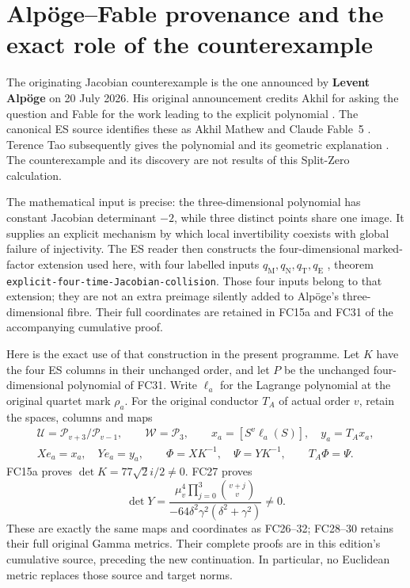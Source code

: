 \section{Alp\"oge--Fable provenance and the exact role of the counterexample}
\label{sec:alpoge-fable-role}

The originating Jacobian counterexample is the one announced by
\textbf{Levent Alp\"oge} on 20 July 2026. His original announcement
credits Akhil for asking the question and Fable for the work leading
to the explicit polynomial \cite{AlpogeAnnouncement}. The canonical
ES source identifies these as Akhil Mathew and Claude Fable~5
\cite{ES488}. Terence Tao subsequently gives the polynomial and
its geometric explanation \cite{Tao}. The counterexample and its
discovery are not results of this Split-Zero calculation.

The mathematical input is precise: the three-dimensional polynomial
has constant Jacobian determinant $-2$, while three distinct points
share one image. It supplies an explicit mechanism by which local
invertibility coexists with global failure of injectivity. The ES
reader then constructs the four-dimensional marked-factor extension
used here, with four labelled inputs $q_{\mathrm M},q_{\mathrm N},
q_{\mathrm T},q_{\mathrm E}$ \cite{ES488}, theorem
\texttt{explicit-four-time-Jacobian-collision}. Those four inputs
belong to that extension; they are not an extra preimage silently
added to Alp\"oge's three-dimensional fibre. Their full coordinates
are retained in FC15a and FC31 of the accompanying cumulative proof.

Here is the exact use of that construction in the present programme.
Let $K$ have the four ES columns in their unchanged order, and let
$P$ be the unchanged four-dimensional polynomial of FC31. Write
$\ell_a$ for the Lagrange polynomial at the original quartet mark
$\rho_a$. For the original conductor $T_A$ of actual order $v$,
retain the spaces, columns and maps
\[
\begin{gathered}
 \mathcal U=\mathcal P_{v+3}/\mathcal P_{v-1},\qquad
 \mathcal W=\mathcal P_3,\qquad
 x_a=[S^v\ell_a(S)],\quad y_a=T_Ax_a,\\
 Xe_a=x_a,\quad Ye_a=y_a,\qquad
 \Phi=XK^{-1},\quad\Psi=YK^{-1},\qquad T_A\Phi=\Psi.
 \tag{ALF1}
\end{gathered}
\]
FC15a proves $\det K=77\sqrt2 i/2\ne0$. FC27 proves
\[
 \det Y=
 \frac{\mu_v^4\prod_{j=0}^3\binom{v+j}{v}}
 {-64\delta^2\gamma^2(\delta^2+\gamma^2)}\ne0.
 \tag{ALF2}
\]
These are exactly the same maps and coordinates as FC26--32;
FC28--30 retains their full original Gamma metrics. Their complete
proofs are in this edition's cumulative source, preceding the new
continuation. In particular, no Euclidean metric replaces those
source and target norms.


